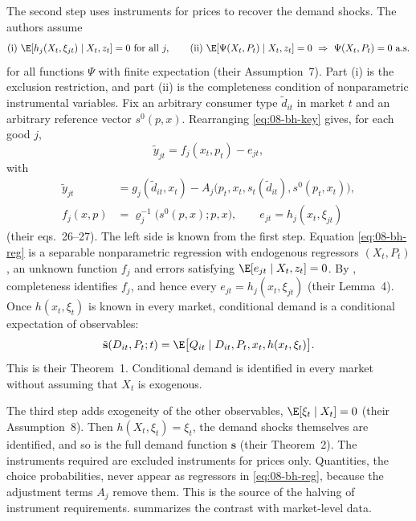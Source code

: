 The second step uses instruments for prices to recover the demand shocks. The authors assume
\begin{equation}\label{eq:08-bh-iv}
  \text{(i)}\ \E[h_j(X_t, \xi_{jt}) \mid X_t, z_t] = 0 \ \text{for all } j, \qquad
  \text{(ii)}\ \E[\Psi(X_t, P_t) \mid X_t, z_t] = 0 \ \Rightarrow\ \Psi(X_t, P_t) = 0 \ \text{a.s.}
\end{equation}
for all functions $\Psi$ with finite expectation (their Assumption~7). Part (i) is the exclusion restriction, and part
(ii) is the completeness condition of nonparametric instrumental variables. Fix an arbitrary consumer type
$\tilde d_{it}$ in market $t$ and an arbitrary reference vector $s^0(p, x)$. Rearranging \eqref{eq:08-bh-key} gives, for
each good $j$,
\begin{equation}\label{eq:08-bh-reg}
  \tilde y_{jt} = f_j(x_t, p_t) - e_{jt},
\end{equation}
with
\begin{align*}
  \tilde y_{jt} &= g_j(\tilde d_{it}, x_t) - A_j\big(p_t, x_t, s_t(\tilde d_{it}), s^0(p_t, x_t)\big), \\
  f_j(x, p) &= \varrho_j^{-1}\big(s^0(p, x); p, x\big), \qquad e_{jt} = h_j(x_t, \xi_{jt})
\end{align*}
(their eqs.~26--27). The left side is known from the first step. Equation \eqref{eq:08-bh-reg} is a separable
nonparametric regression with endogenous regressors $(X_t, P_t)$, an unknown function $f_j$ and errors satisfying
$\E[e_{jt} \mid X_t, z_t] = 0$. By \citet[Proposition~2.1]{NeweyPowell2003}, completeness identifies $f_j$, and hence
every $e_{jt} = h_j(x_t, \xi_{jt})$ (their Lemma~4). Once $h(x_t, \xi_t)$ is known in every market, conditional demand
is a conditional expectation of observables:
\begin{equation*}
  \tilde{\mathbf{s}}(D_{it}, P_t; t) = \E\big[Q_{it} \mid D_{it}, P_t, x_t, h(x_t, \xi_t)\big].
\end{equation*}
This is their Theorem~1. Conditional demand is identified in every market without assuming that $X_t$ is exogenous.

The third step adds exogeneity of the other observables, $\E[\xi_t \mid X_t] = 0$ (their Assumption~8). Then
$h(X_t, \xi_t) = \xi_t$, the demand shocks themselves are identified, and so is the full demand function
$\mathbf{s}$ (their Theorem~2). The instruments required are excluded instruments for prices only. Quantities, the
choice probabilities, never appear as regressors in \eqref{eq:08-bh-reg}, because the adjustment terms $A_j$ remove
them. This is the source of the halving of instrument requirements.  summarizes the contrast
with market-level data.

